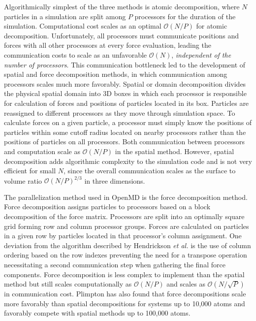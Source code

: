 \documentclass[]{book}
\begin{document}
Algorithmically simplest of the three methods is atomic decomposition,
where $N$ particles in a simulation are split among $P$ processors for
the duration of the simulation. Computational cost scales as an
optimal $\mathcal{O}(N/P)$ for atomic decomposition. Unfortunately, all
processors must communicate positions and forces with all other
processors at every force evaluation, leading the communication costs
to scale as an unfavorable $\mathcal{O}(N)$, \emph{independent of the
number of processors}. This communication bottleneck led to the
development of spatial and force decomposition methods, in which
communication among processors scales much more favorably. Spatial or
domain decomposition divides the physical spatial domain into 3D boxes
in which each processor is responsible for calculation of forces and
positions of particles located in its box. Particles are reassigned to
different processors as they move through simulation space. To
calculate forces on a given particle, a processor must simply know the
positions of particles within some cutoff radius located on nearby
processors rather than the positions of particles on all
processors. Both communication between processors and computation
scale as $\mathcal{O}(N/P)$ in the spatial method. However, spatial
decomposition adds algorithmic complexity to the simulation code and
is not very efficient for small $N$, since the overall communication
scales as the surface to volume ratio $\mathcal{O}(N/P)^{2/3}$ in
three dimensions.

The parallelization method used in {\sc OpenMD} is the force
decomposition method.\cite{hendrickson:95} Force decomposition assigns
particles to processors based on a block decomposition of the force
matrix. Processors are split into an optimally square grid forming row
and column processor groups. Forces are calculated on particles in a
given row by particles located in that processor's column
assignment. One deviation from the algorithm described by Hendrickson
{\it et al.} is the use of column ordering based on the row indexes
preventing the need for a transpose operation necessitating a second
communication step when gathering the final force components.  Force
decomposition is less complex to implement than the spatial method but
still scales computationally as $\mathcal{O}(N/P)$ and scales as
$\mathcal{O}(N/\sqrt{P})$ in communication cost. Plimpton has also
found that force decompositions scale more favorably than spatial
decompositions for systems up to 10,000 atoms and favorably compete
with spatial methods up to 100,000 atoms.\cite{plimpton95}
 
\end{document}
